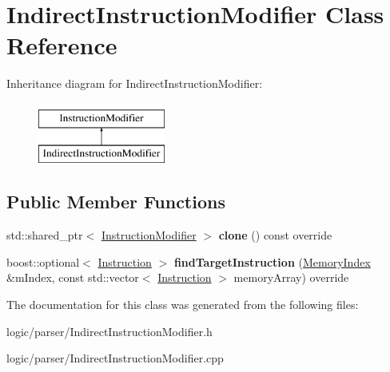 \hypertarget{classIndirectInstructionModifier}{}\section{Indirect\+Instruction\+Modifier Class Reference}
\label{classIndirectInstructionModifier}
Inheritance diagram for Indirect\+Instruction\+Modifier\+:\begin{figure}[H]
\begin{center}
\leavevmode
\includegraphics[height=2.000000cm]{classIndirectInstructionModifier}
\end{center}
\end{figure}
\subsection*{Public Member Functions}
\begin{DoxyCompactItemize}
\item 
\mbox{\label{classIndirectInstructionModifier_adea8e4cec4a4c02c2144663ce6acd6d3}} 
std\+::shared\+\_\+ptr$<$ \hyperlink{classInstructionModifier}{Instruction\+Modifier} $>$ {\bfseries clone} () const override
\item 
\mbox{\label{classIndirectInstructionModifier_a4ff00cbee335058a785365c014cc4aff}} 
boost\+::optional$<$ \hyperlink{classInstruction}{Instruction} $>$ {\bfseries find\+Target\+Instruction} (\hyperlink{classMemoryIndex}{Memory\+Index} \&m\+Index, const std\+::vector$<$ \hyperlink{classInstruction}{Instruction} $>$ memory\+Array) override
\end{DoxyCompactItemize}


The documentation for this class was generated from the following files\+:\begin{DoxyCompactItemize}
\item 
logic/parser/Indirect\+Instruction\+Modifier.\+h\item 
logic/parser/Indirect\+Instruction\+Modifier.\+cpp\end{DoxyCompactItemize}
